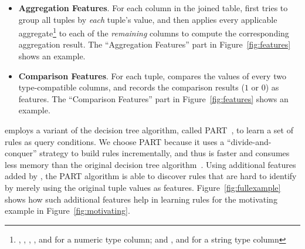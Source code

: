 \begin{itemize}

\item {\textbf{Aggregation Features}}. For each
column in the joined table, \ourtool first tries
to group all tuples by \textit{each} tuple's
value, and then applies every applicable aggregate\footnote{
, , ,
, and  for a numeric type column;
and , and  for
a string type column} to each of the
 \textit{remaining} columns to compute the corresponding aggregation result. 
The ``Aggregation Features'' part in Figure~\ref{fig:features}
shows an example.

\item {\textbf{Comparison Features}}. For each tuple,
\ourtool compares
the values of every two type-compatible columns, and records
the comparison results ($1$ or $0$) as features.
The ``Comparison Features'' part in Figure~\ref{fig:features}
shows an example.

\end{itemize}



\ourtool employs a variant of the decision tree algorithm,
called PART~\cite{Frank:1998}, to learn a set of rules
as query conditions. We choose PART
because it uses a ``divide-and-conquer'' strategy to 
build rules incrementally, and thus is faster
and consumes less memory than
the original decision tree algorithm~\cite{Quinlan:1986}.
Using additional features added by \ourtool, the
PART algorithm is able to discover rules that are
hard to identify by merely using the original tuple values as features.
Figure~\ref{fig:fullexample} shows how such additional features
help in learning rules for the motivating
example in Figure~\ref{fig:motivating}.





